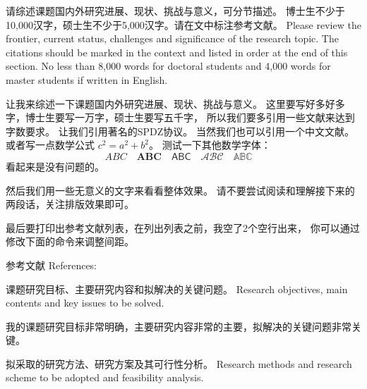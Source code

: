 \documentclass[a4paper,zihao=-4,AutoFakeBold]{ctexart}
\begin{document}
\begin{requirement}
    请综述课题国内外研究进展、现状、挑战与意义，可分节描述。
    博士生不少于10,000汉字，硕士生不少于5,000汉字。请在文中标注参考文献。 
    Please review the frontier, current status, 
    challenges and significance of the research topic. 
    The citations should be marked in the context 
    and listed in order at the end of this section. 
    No less than 8,000 words for doctoral students 
    and 4,000 words for master students if written in English.
\end{requirement}

\begin{content}
    让我来综述一下课题国内外研究进展、现状、挑战与意义。
    这里要写好多好多字，博士生要写一万字，硕士生要写五千字，
    所以我们要多引用一些文献来达到字数要求。
    让我们引用著名的SPDZ协议\cite{SPDZ}。
    当然我们也可以引用一个中文文献\cite{ZJSD}。
    或者写一点数学公式 $c^2 = a^2 + b^2$。
    测试一下其他数学字体：
    \[
        ABC\quad
        \mathbf{ABC}\quad
        \mathsf{ABC}\quad
        \mathcal{ABC}\quad
        \mathbb{ABC}\quad
    \]
    看起来是没有问题的。

    然后我们用一些无意义的文字来看看整体效果。
    请不要尝试阅读和理解接下来的两段话，关注排版效果即可。

    \zhlipsum[1-2]

    最后要打印出参考文献列表，在列出列表之前，我空了2个空行出来，
    你可以通过修改下面的命令来调整间距。

    \vspace{2\baselineskip}
    \linespread{1.25}\selectfont %
    参考文献 References: 
    \printbibliography[heading=none]
\end{content}


\begin{requirement}
    课题研究目标、主要研究内容和拟解决的关键问题。 
    Research objectives, main contents and key issues to be solved.
\end{requirement}

\begin{content}
    我的课题研究目标非常明确，主要研究内容非常的主要，拟解决的关键问题非常关键。
\end{content}


\begin{requirement}
    拟采取的研究方法、研究方案及其可行性分析。
    Research methods and research scheme to be adopted 
    and feasibility analysis.
\end{requirement}
\end{document}
